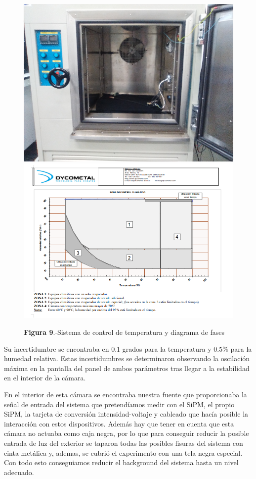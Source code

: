 \begin{enumerate}
\begin{figure}[htb]
\centering
{
\includegraphics[scale=0.3]{InteriorTemperatura.png} 
}
{
\includegraphics[scale=0.3]{FichaTecnica.png} 
}
\caption{\textbf{Figura 9}.-Sistema de control de temperatura y diagrama de fases~\cite{dycometal}}
\end{figure}

Su incertidumbre se encontraba en 0.1 grados para la temperatura y 0.5\% para la humedad relativa. Estas incertidumbres se determinaron observando la oscilación  máxima en la pantalla del panel de ambos parámetros tras llegar a la estabilidad en el interior de la cámara.

En el interior de esta cámara se encontraba nuestra fuente que proporcionaba la señal de entrada del sistema que pretendíamos medir con el SiPM, el propio SiPM, la tarjeta de conversión intensidad-voltaje y cableado que hacía posible la interacción con estos dispositivos. Además hay que tener en cuenta que esta cámara no actuaba como caja negra, por lo que para conseguir reducir la posible entrada de luz del exterior se taparon todas las posibles fisuras del sistema con cinta metálica y, ademas, se cubrió el experimento con una tela negra especial. Con todo esto conseguiamos reducir el background del sistema hasta un nivel adecuado.


\end{enumerate}
